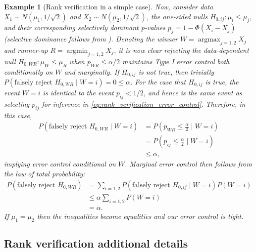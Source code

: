 \documentclass{article}
\DeclareMathOperator*{\argmin}{argmin}
\DeclareMathOperator*{\argmax}{argmax}
\newtheorem{example}{Example}
\begin{document}
\begin{appendix}
\begin{example}[Rank verification in a simple case]
    Now, consider data $X_1 \sim N(\mu_1, 1/\sqrt{2})$ and $X_2 \sim N(\mu_2, 1/\sqrt{2})$, the one-sided nulls $H_{0, ij}: \mu_i \leq \mu_j$, and their corresponding selectively dominant p-values $p_j = 1 - \Phi(X_i - X_j)$ (selective dominance follows from ). Denoting the winner $W = \argmax_{j = 1, 2} X_j$ and runner-up $R = \argmin_{j = 1, 2} X_j$, it is now clear rejecting the data-dependent null $H_{0, WR}: \mu_W \leq \mu_R$ when $p_{WR} \leq \alpha/2$ maintains Type I error control both conditionally on $W$ and marginally. If $H_{0, ij}$ is not true, then trivially $P(\text{falsely reject } H_{0, WR} \mid W = i) = 0 \leq \alpha$. For the case that $H_{0, ij}$ is true, the event $W=i$ is identical to the event $p_{ij} < 1/2$, and hence is the same event as selecting $p_{ij}$ for inference in \eqref{eq:rank_verification_error_control}. Therefore, in this case,
    \begin{align*}
        P(\text{falsely reject } H_{0, WR} \mid W = i) &= P\left(p_{WR} \leq \frac{\alpha}{2}  \mid W = i\right)\\
        &= P\left(p_{ij} \leq \frac{\alpha}{2}  \mid W = i \right) \\
        &\leq \alpha,
    \end{align*}
    implying error control conditional on $W$. Marginal error control then follows from the law of total probability:
    \begin{align*}
        P(\text{falsely reject } H_{0, WR}) &= \sum_{i=1, 2} P(\text{falsely reject } H_{0,ij} \mid W = i)P(W=i) \\
                                          &\leq \alpha \sum_{i = 1, 2} P(W=i)\\
                                          &=\alpha. 
    \end{align*}
    If $\mu_1 = \mu_2$ then the inequalities become equalities and our error control is tight. 
    \end{example}

\subsection{Rank verification additional details}
\label{sec:rank_verification_appdx}


\end{appendix}
\end{document}
